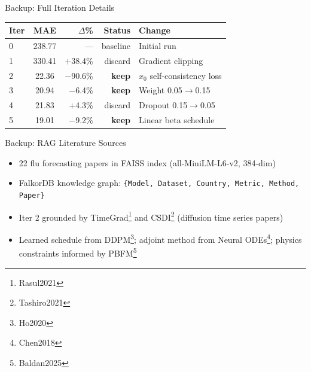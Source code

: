 \documentclass[10pt]{beamer}
\newcommand{\papercite}[1]{\footnote{\tiny #1}}
\begin{document}
\begin{frame}{Backup: Full Iteration Details}
  \centering
  \begin{tabular}{lcrrl}
    \toprule
    Iter & MAE & $\Delta$\% & Status & Change \\
    \midrule
    0 & 238.77 & --- & baseline & Initial run \\
    1 & 330.41 & $+$38.4\% & discard & Gradient clipping \\
    2 & 22.36 & $-$90.6\% & \textbf{keep} & $x_0$ self-consistency loss \\
    3 & 20.94 & $-$6.4\% & \textbf{keep} & Weight 0.05$\to$0.15 \\
    4 & 21.83 & $+$4.3\% & discard & Dropout 0.15$\to$0.05 \\
    5 & 19.01 & $-$9.2\% & \textbf{keep} & Linear beta schedule \\
    \bottomrule
  \end{tabular}
\end{frame}

\begin{frame}{Backup: RAG Literature Sources}
  \begin{itemize}
    \item 22 flu forecasting papers in FAISS index (all-MiniLM-L6-v2, 384-dim)
    \item FalkorDB knowledge graph: \texttt{\{Model, Dataset, Country, Metric,
          Method, Paper\}}
    \item Iter 2 grounded by TimeGrad\papercite{Rasul2021} and
          CSDI\papercite{Tashiro2021} (diffusion time series papers)
    \item Learned schedule from DDPM\papercite{Ho2020}; adjoint method from
          Neural ODEs\papercite{Chen2018}; physics constraints informed by
          PBFM\papercite{Baldan2025}
  \end{itemize}
\end{frame}
\end{document}
